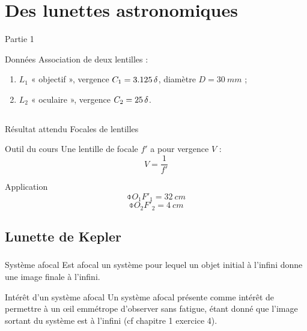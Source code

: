 \documentclass[10pt,a5paper,notitlepage]{book}
\begin{document}
\section{Des lunettes astronomiques}
\begin{center}
    \huge Partie 1
\end{center}

\pagebreak

\begin{NCdefi}{Données}
    Association de deux lentilles :
    \begin{enumerate}
        \item $L_1$ « objectif », vergence $C_1 = \SI{3.125}{\delta}$, diamètre $D
            = \SI{30}{mm}$ ;
        \item $L_2$ « oculaire », vergence $C_2 = \SI{25}{\delta}$.
    \end{enumerate}
\end{NCdefi}

\subsection{}

\begin{NCprop}{Résultat attendu}
    Focales de lentilles
\end{NCprop}

\begin{NCdemo}{Outil du cours}
    Une lentille de focale $f'$ a pour vergence $V$ :
    \[ V = \frac{1}{f'} \]
\end{NCdemo}

\begin{NCexem}{Application}
    \[ \boxed{\obar{O_1F'_1} = \SI{32}{cm}} \]
    \[ \boxed{\obar{O_2F'_2} = \SI{4}{cm}} \]
\end{NCexem}

\subsection{Lunette de Kepler}
\subsubsection{}
\begin{defi}{Système afocal}
    Est afocal un système pour lequel un objet initial à l'infini donne une
    image finale à l'infini.
\end{defi}

\begin{inte}{Intérêt d'un système afocal}
    Un système afocal présente comme intérêt de permettre à un œil emmétrope
    d'observer sans fatigue, étant donné que l'image sortant du système est à
    l'infini (cf chapitre 1 exercice 4).
\end{inte}
\end{document}
